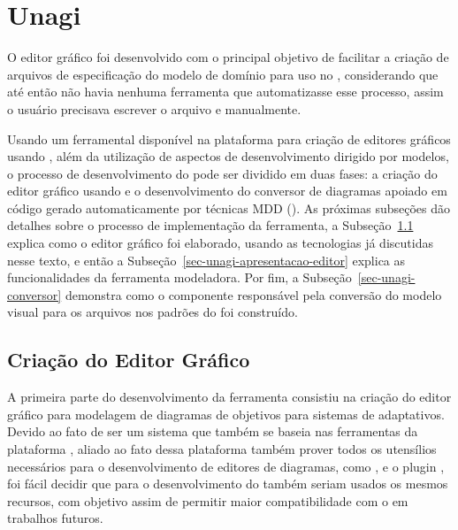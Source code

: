 \chapter{Unagi}
\label{sec-unagi}

O editor gráfico \unagi foi desenvolvido com o principal objetivo de facilitar a criação de arquivos de especificação do modelo de domínio para uso no \zanshin, considerando que até então não havia nenhuma ferramenta que automatizasse esse processo, assim o usuário precisava escrever o arquivo \xml e \ecore manualmente. 

Usando um ferramental disponível na plataforma \eclipse para criação de editores gráficos usando \emf, além da utilização de aspectos de desenvolvimento dirigido por modelos, o processo de desenvolvimento do \unagi pode ser dividido em duas fases: a criação do editor gráfico usando \sirius e o desenvolvimento do conversor de diagramas apoiado em código gerado automaticamente por técnicas MDD (\mdd). As próximas subseções dão detalhes sobre o processo de implementação da ferramenta, a Subseção~\ref{sec-unagi-criacao-editor} explica como o editor gráfico foi elaborado, usando as tecnologias já discutidas nesse texto, e então a Subseção~\ref{sec-unagi-apresentacao-editor} explica as funcionalidades da ferramenta modeladora. Por fim, a Subseção~\ref{sec-unagi-conversor} demonstra como o componente responsável pela conversão do modelo visual para os arquivos nos padrões do \zanshin foi construído.


\section{Criação do Editor Gráfico}
\label{sec-unagi-criacao-editor}

A primeira parte do desenvolvimento da ferramenta consistiu  na criação do editor gráfico para modelagem de diagramas de objetivos para sistemas de adaptativos. Devido ao fato de \zanshin ser um sistema que também se baseia nas ferramentas da plataforma \eclipse, aliado ao fato dessa plataforma também prover todos os utensílios necessários para o desenvolvimento de editores de diagramas, como \ecore, \emf e o plugin \sirius, foi fácil decidir que para o desenvolvimento do \unagi também seriam usados os mesmos recursos, com objetivo assim de permitir maior compatibilidade com o \zanshin em trabalhos futuros.

